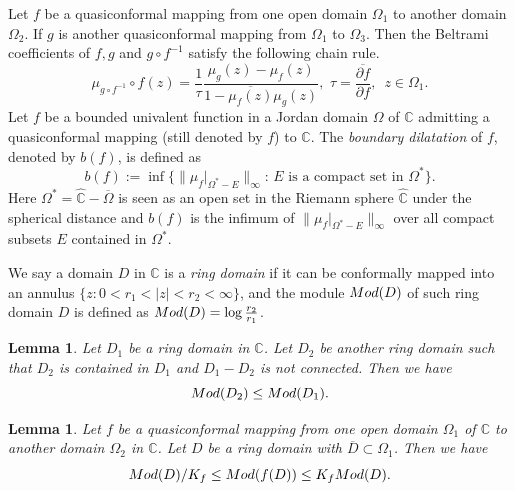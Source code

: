 \documentclass[11pt]{amsart}
\newtheorem{lemma}[theorem]{Lemma}
\theoremstyle{remark}
\theoremstyle{claim}
\theoremstyle{definition}
\theoremstyle{problem}
\theoremstyle{conjecture}
\theoremstyle{question}
\numberwithin{equation}{section}
\begin{document}
Let $f$ be a quasiconformal mapping from one open domain $\Omega_1$ to another domain $\Omega_2$. If $g$ is another quasiconformal mapping from $\Omega_1$ to $\Omega_3$. Then the Beltrami coefficients of $f, g$ and $g \circ f^{-1}$ satisfy the following chain rule.
\begin{equation}\label{dila}
\mu_{g \circ f^{-1}}\circ f(z) =\frac{1}{\tau}\frac{\mu_g(z)-\mu_f(z)}{1-\overline{\mu_f(z)}\mu_g(z)},\,\, \tau=\frac{\overline{\partial f}}{\partial f}, \,\,\, z\in \Omega_1.
\end{equation}
 Let $f$ be a bounded univalent function in a Jordan domain $\Omega$ of $\mathbb{C}$ admitting a quasiconformal mapping (still denoted by $f$) to $\widehat{\mathbb{C}}$.  The {\em boundary dilatation} of $f$, denoted by $b(f)$, is defined as
\begin{equation}
b(f):=\inf\{\|\mu_f|_{\Omega^{*}-E}\|_{\infty}: \, E {\text { is a compact set in}}\,\, \Omega^{*}\}. \nonumber
\end{equation}
Here $ \Omega^{*}=\widehat{\mathbb{C}}-\overline{\Omega}$ is seen as an open set in the Riemann sphere $\widehat{\mathbb{C}}$ under the spherical distance and $b(f)$ is the infimum of $\|\mu_f|_{\Omega^{*}-E}\|_{\infty}$ over all compact subsets $E$ contained in $\Omega^{*}$.

We say a domain $D$ in $\mathbb{C}$ is  a {\em ring domain} if it can be conformally mapped into an annulus $\{z: 0<r_1<|z|<r_2<\infty\}$, and the module ${\textup{Mod}}(D)$ of such ring domain $D$ is defined as ${\textup{Mod}}(D)=\log \frac{r_2}{r_1}$.
\begin{lemma}\label{l0}
Let $D_1$ be a ring domain in $\mathbb{C}$. Let $D_2$ be another ring domain such that ${D_2}$ is contained in $D_1$ and $D_1-{D_2}$ is not connected. Then we have
\begin{equation}
{\textup{Mod}}(D_2) \leq {\textup{Mod}}(D_1).\nonumber
\end{equation}
\end{lemma}

\begin{lemma}\label{l1}
Let $f$ be a quasiconformal mapping from one open domain $\Omega_1$ of $\mathbb{C}$ to another domain $\Omega_2$ in $\mathbb{C}$. Let $D$ be a ring domain with $\overline{D} \subset \Omega_1$. Then we have
\begin{equation}
{\textup{Mod}}(D)/K_f\leq {\textup{Mod}}(f(D))\leq K_f {\textup{Mod}}(D).\nonumber
\end{equation}
\end{lemma}
\end{document}
